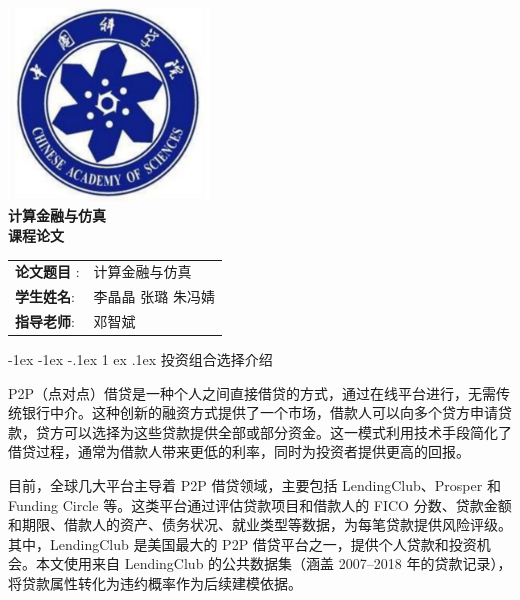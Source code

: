 \documentclass[12pt,nonblindrev]{write_paper}
\makeatletter
\renewcommand\section{\@startsection {section}{1}{\z@}%
                                   {-1ex \@plus -1ex \@minus -.1ex}%
                                   {1 ex \@plus.1ex}%
                                   {\normalfont\large\bfseries}}
\makeatother
\begin{document}
\vspace*{\fill}

\begin{center}

    \includegraphics[width=0.4\textwidth]{Figures/校徽.png}\\[1cm]
       \Huge \bfseries
       \textbf{计算金融与仿真}\\[0.5cm]
       \Huge \bfseries
       \textbf{课程论文}\\[2cm]
    
    \Large
    \begin{table}[htbp]
    \centering
    \Large
    \begin{tabular}{ll}
    \textbf{论文题目 }: & 计算金融与仿真 \\
    \textbf{学生姓名}: & 李晶晶 \quad 张璐 \quad 朱冯婧 \\
    \textbf{指导老师}: & 邓智斌 
    \end{tabular}
    \end{table}

    


\end{center}

\vspace*{\fill}
\newpage





\section{投资组合选择介绍}


P2P（点对点）借贷是一种个人之间直接借贷的方式，通过在线平台进行，无需传统银行中介。这种创新的融资方式提供了一个市场，借款人可以向多个贷方申请贷款，贷方可以选择为这些贷款提供全部或部分资金。这一模式利用技术手段简化了借贷过程，通常为借款人带来更低的利率，同时为投资者提供更高的回报。

目前，全球几大平台主导着 P2P 借贷领域，主要包括 LendingClub、Prosper 和 Funding Circle 等。这类平台通过评估贷款项目和借款人的 FICO 分数、贷款金额和期限、借款人的资产、债务状况、就业类型等数据，为每笔贷款提供风险评级。其中，LendingClub 是美国最大的 P2P 借贷平台之一，提供个人贷款和投资机会。本文使用来自 LendingClub 的公共数据集（涵盖 2007--2018 年的贷款记录），将贷款属性转化为违约概率作为后续建模依据。
\end{document}
